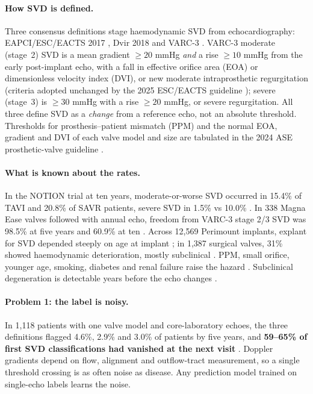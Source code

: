 \documentclass[11pt,a4paper]{article}
\begin{document}
\paragraph{How SVD is defined.} Three consensus definitions stage haemodynamic SVD from echocardiography: EAPCI/ESC/EACTS 2017 \cite{capodanno2017}, Dvir 2018 \cite{dvir2018} and VARC-3 \cite{genereux2021}. VARC-3 moderate (stage~2) SVD is a mean gradient $\geq 20$ mmHg \emph{and} a rise $\geq 10$ mmHg from the early post-implant echo, with a fall in effective orifice area (EOA) or dimensionless velocity index (DVI), or new moderate intraprosthetic regurgitation (criteria adopted unchanged by the 2025 ESC/EACTS guideline \cite{praz2025}); severe (stage~3) is $\geq 30$ mmHg with a rise $\geq 20$ mmHg, or severe regurgitation. All three define SVD as a \emph{change} from a reference echo, not an absolute threshold. Thresholds for prosthesis--patient mismatch (PPM) and the normal EOA, gradient and DVI of each valve model and size are tabulated in the 2024 ASE prosthetic-valve guideline \cite{zoghbi2024}.

\paragraph{What is known about the rates.} In the NOTION trial at ten years, moderate-or-worse SVD occurred in 15.4\% of TAVI and 20.8\% of SAVR patients, severe SVD in 1.5\% vs 10.0\% \cite{thyregod2024}. In 338 Magna Ease valves followed with annual echo, freedom from VARC-3 stage 2/3 SVD was 98.5\% at five years and 60.9\% at ten \cite{kermen2022}. Across 12,569 Perimount implants, explant for SVD depended steeply on age at implant \cite{johnston2015}; in 1,387 surgical valves, 31\% showed haemodynamic deterioration, mostly subclinical \cite{salaun2018}. PPM, small orifice, younger age, smoking, diabetes and renal failure raise the hazard \cite{trimaille2025,wakami2022}. Subclinical degeneration is detectable years before the echo changes \cite{cartlidge2019}.

\paragraph{Problem 1: the label is noisy.} In 1,118 patients with one valve model and core-laboratory echoes, the three definitions flagged 4.6\%, 2.9\% and 3.0\% of patients by five years, and \textbf{59--65\% of first SVD classifications had vanished at the next visit} \cite{velders2024}. Doppler gradients depend on flow, alignment and outflow-tract measurement, so a single threshold crossing is as often noise as disease. Any prediction model trained on single-echo labels learns the noise.
\end{document}

